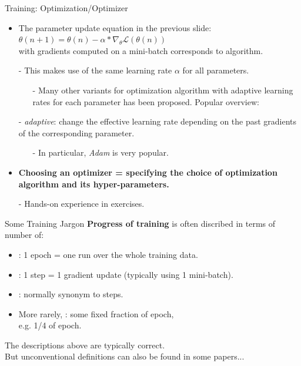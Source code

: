 \begin{frame}{Training: Optimization/Optimizer}
\begin{itemize}
\item The parameter update equation in the previous slide:\\
$\theta(n+1) = \theta(n) - \alpha * \nabla_{\theta} \mathcal{L}(\theta(n))$\\
with gradients computed on a mini-batch corresponds to  algorithm.
\pause
\item[-] This makes use of the same learning rate $\alpha$ for all parameters.
\begin{itemize}
\item[-] Many other variants for optimization algorithm with adaptive learning rates for each parameter has been proposed.
Popular overview: 
\end{itemize}
\pause
\item[-] \textit{adaptive}: change the effective learning rate depending on the past gradients of the corresponding parameter.
\begin{itemize}
\item[-] In particular, \textit{Adam}  is very popular.
\end{itemize}
\pause
\item \textbf{Choosing an optimizer = specifying the choice of optimization algorithm and its hyper-parameters.}
\item[-] Hands-on experience in exercises.
\end{itemize}
\end{frame}


\begin{frame}{Some Training Jargon}
\textbf{Progress of training} is often discribed in terms of number of:
\vsp
\begin{itemize}
\item {}: 1 epoch = one run over the whole training data.
\item {}: 1 step = 1 gradient update (typically using 1 mini-batch).
\item {}: normally synonym to steps.
\item More rarely, : some fixed fraction of epoch,\\ e.g. 1/4 of epoch.
\end{itemize}
\vsp
The descriptions above are typically correct.\\
But unconventional definitions can also be found in some papers...
\end{frame}

